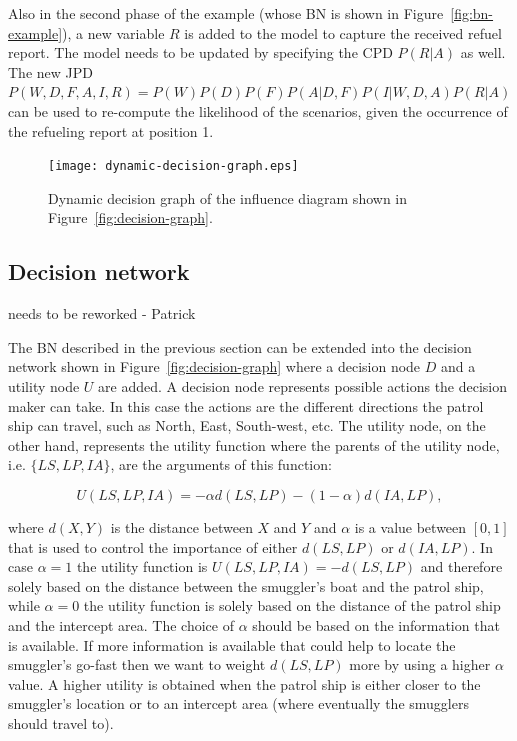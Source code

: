 \documentclass[conference]{IEEEtran}
\begin{document}
Also in the second phase of the example (whose BN is shown in Figure~\ref{fig:bn-example}), a new variable $R$ is added to the model to capture the received refuel report. The model needs to be updated by specifying the CPD $P(R|A)$ as well. The new JPD $P(W,D,F,A,I,R) = P(W)P(D)P(F)P(A|D,F)P(I|W,D,A)P(R|A)$ can be used to re-compute the likelihood of the scenarios, given the occurrence of the refueling report at position 1.


\begin{figure}[!t]
\begin{center}
 \texttt{[image: dynamic-decision-graph.eps]}
 \caption{Dynamic decision graph of the influence diagram shown in Figure~\ref{fig:decision-graph}.}
\end{center}
\end{figure}


\subsection{Decision network}

{\red needs to be reworked - Patrick}

The BN described in the previous section can be extended into the decision network shown in Figure~\ref{fig:decision-graph} where a decision node $D$ and a utility node $U$ are added. A decision node represents possible actions the decision maker can take. In this case the actions are the different directions the patrol ship can travel, such as North, East, South-west, etc. The utility node, on the other hand, represents the utility function where the parents of the utility node, i.e. $\{LS,LP,IA\}$, are the arguments of this function:

\[
 U(LS,LP,IA) = -\alpha d(LS,LP) - (1-\alpha) d(IA,LP),
\]

where $d(X,Y)$ is the distance between $X$ and $Y$ and $\alpha$ is a value between $[0,1]$ that is used to control the importance of either $d(LS,LP)$ or $d(IA,LP)$. In case $\alpha=1$ the utility function is $U(LS,LP,IA) = -d(LS,LP)$ and therefore solely based on the distance between the smuggler's boat and the patrol ship, while $\alpha=0$ the utility function is solely based on the distance of the patrol ship and the intercept area. The choice of $\alpha$ should be based on the information that is available. If more information is available that could help to locate the smuggler's go-fast then we want to weight  $d(LS,LP)$ more by using a higher $\alpha$ value. A higher utility is obtained when the patrol ship is either closer to the smuggler's location or to an intercept area (where eventually the smugglers should travel to).
\end{document}
